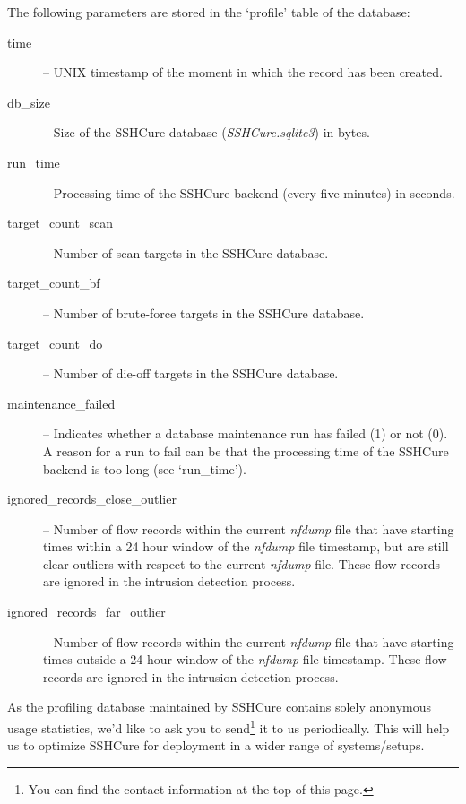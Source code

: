 The following parameters are stored in the `profile' table of the database:

\begin{description}
	\item [time] -- UNIX timestamp of the moment in which the record has been created.
	
	\item [db\_size] -- Size of the SSHCure database (\textit{SSHCure.sqlite3}) in bytes.
	
	\item [run\_time] -- Processing time of the SSHCure backend (every five minutes) in seconds.
	
	\item [target\_count\_scan] -- Number of scan targets in the SSHCure database.
	
	\item [target\_count\_bf] -- Number of brute-force targets in the SSHCure database.
	
	\item [target\_count\_do] -- Number of die-off targets in the SSHCure database.
	
	\item [maintenance\_failed] -- Indicates whether a database maintenance run has failed (\textsc{1}) or not (\textsc{0}). A reason for a run to fail can be that the processing time of the SSHCure backend is too long (see `run\_time').
	
	\item [ignored\_records\_close\_outlier] -- Number of flow records within the current \textit{nfdump} file that have starting times within a 24 hour window of the \textit{nfdump} file timestamp, but are still clear outliers with respect to the current \textit{nfdump} file. These flow records are ignored in the intrusion detection process.
	
	\item [ignored\_records\_far\_outlier] -- Number of flow records within the current \textit{nfdump} file that have starting times outside a 24 hour window of the \textit{nfdump} file timestamp. These flow records are ignored in the intrusion detection process.
\end{description}

As the profiling database maintained by SSHCure contains solely anonymous usage statistics, we'd like to ask you to send\footnote{You can find the contact information at the top of this page.} it to us periodically. This will help us to optimize SSHCure for deployment in a wider range of systems/setups.

